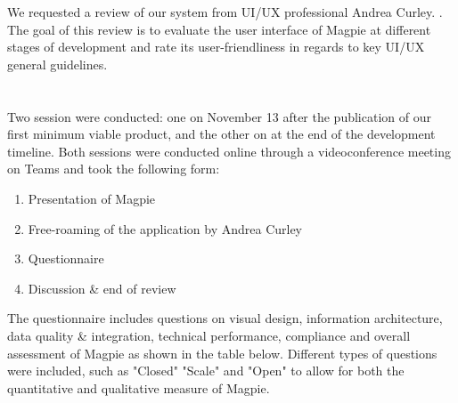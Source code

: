 We requested a review of our system from UI/UX professional Andrea Curley. .\\
The goal of this review is to evaluate the user interface of Magpie at different stages of development and rate its user-friendliness in regards to key UI/UX general guidelines.\\
 \\ \\

Two session were conducted: one on November 13 after the publication of our first minimum viable product, and the other on  at the end of the development timeline. Both sessions were conducted online through a videoconference meeting on Teams and took the following form:
\begin{enumerate}
    \item Presentation of Magpie
    \item Free-roaming of the application by Andrea Curley
    \item Questionnaire
    \item Discussion \& end of review
\end{enumerate}
The questionnaire includes questions on visual design, information architecture, data quality \& integration, technical performance, compliance and overall assessment of Magpie as shown in the table below. Different types of questions were included, such as "Closed" "Scale" and "Open" to allow for both the quantitative and qualitative measure of Magpie. \\ \\
